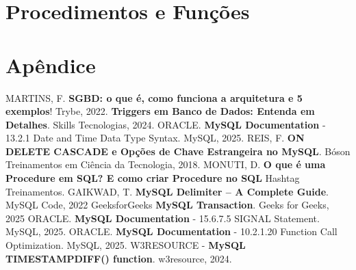 \documentclass[a4paper,12pt]{article}
\begin{document}
\newpage
\section{Procedimentos e Funções}






\newpage
\newpage
\section{Apêndice}\label{sec:Apendice}


\newpage
\begin{thebibliography}{99}
     MARTINS, F. \textbf{SGBD: o que é, como funciona a arquitetura e 5 exemplos}!  Trybe, 2022.
     \textbf{Triggers em Banco de Dados: Entenda em Detalhes}. Skills Tecnologias, 2024.
     ORACLE. \textbf{MySQL Documentation} - 13.2.1 Date and Time Data Type Syntax. MySQL, 2025.
     REIS, F. \textbf{ON DELETE CASCADE e Opções de Chave Estrangeira no MySQL}. Bóson Treinamentos em Ciência da Tecnologia, 2018.
     MONUTI, D. \textbf{O que é uma Procedure em SQL? E como criar Procedure no SQL} Hashtag Treinamentos. 
     GAIKWAD, T. \textbf{MySQL Delimiter – A Complete Guide}. MySQL Code, 2022
     GeeksforGeeks \textbf{MySQL Transaction}. Geeks for Geeks, 2025
     ORACLE. \textbf{MySQL Documentation} - 15.6.7.5 SIGNAL Statement. MySQL, 2025.
     ORACLE. \textbf{MySQL Documentation} - 10.2.1.20 Function Call Optimization. MySQL, 2025.
     W3RESOURCE - \textbf{MySQL TIMESTAMPDIFF() function}. w3resource, 2024.    
\end{thebibliography}
\end{document}
